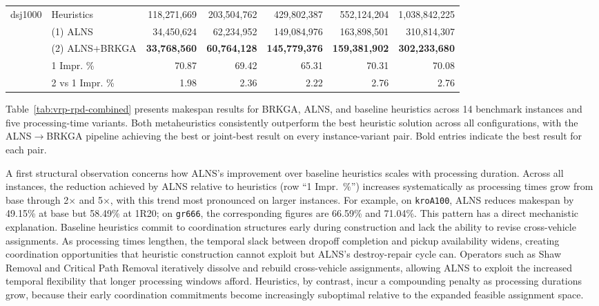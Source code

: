 \documentclass{article}
\begin{document}
\begin{longtable}{p{1.5cm}|p{3cm}|r|r|r|r|r}
dsj1000 & Heuristics & 118,271,669 & 203,504,762 & 429,802,387 & 552,124,204 & 1,038,842,225 \\
  & (1) ALNS & 34,450,624 & 62,234,952 & 149,084,976 & 163,898,501 & 310,814,307 \\
  & (2) ALNS+BRKGA & \textbf{33,768,560} & \textbf{60,764,128} & \textbf{145,779,376} & \textbf{159,381,902} & \textbf{302,233,680} \\
 & 1 Impr. \% &70.87 & 69.42 & 65.31 & 70.31 & 70.08 \\
& 2 vs 1 Impr. \% & 1.98 & 2.36 & 2.22 & 2.76 & 2.76 \\
\end{longtable}


Table~\ref{tab:vrp-rpd-combined} presents makespan results for BRKGA, ALNS, and baseline heuristics across 14 benchmark instances and five processing-time variants. Both metaheuristics consistently outperform the best heuristic solution across all configurations, with the ALNS$\to$BRKGA pipeline achieving the best or joint-best result on every instance-variant pair. Bold entries indicate the best result for each pair.

A first structural observation concerns how ALNS's improvement over baseline heuristics scales with processing duration. Across all instances, the reduction achieved by ALNS relative to heuristics (row ``1 Impr.~\%'') increases systematically as processing times grow from base through 2$\times$ and 5$\times$, with this trend most pronounced on larger instances. For example, on \texttt{kroA100}, ALNS reduces makespan by 49.15\% at base but 58.49\% at 1R20; on \texttt{gr666}, the corresponding figures are 66.59\% and 71.04\%. This pattern has a direct mechanistic explanation. Baseline heuristics commit to coordination structures early during construction and lack the ability to revise cross-vehicle assignments. As processing times lengthen, the temporal slack between dropoff completion and pickup availability widens, creating coordination opportunities that heuristic construction cannot exploit but ALNS's destroy-repair cycle can. Operators such as Shaw Removal and Critical Path Removal iteratively dissolve and rebuild cross-vehicle assignments, allowing ALNS to exploit the increased temporal flexibility that longer processing windows afford. Heuristics, by contrast, incur a compounding penalty as processing durations grow, because their early coordination commitments become increasingly suboptimal relative to the expanded feasible assignment space.
\end{document}
